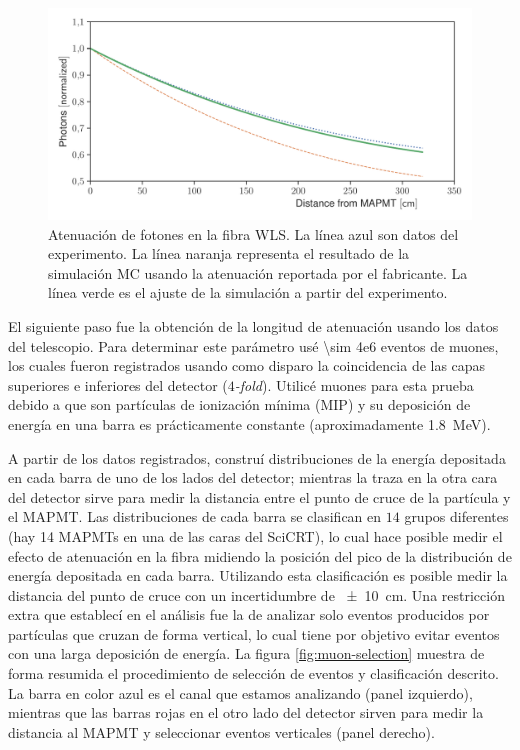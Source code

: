 \begin{figure}
        \centering
        \includegraphics[width=\textwidth]{data_atlength.pdf}
        \caption{Atenuación de fotones en la fibra WLS. La línea azul son datos del experimento. La línea naranja representa el resultado de la simulación MC usando la atenuación reportada por el fabricante. La línea verde es el ajuste de la simulación a partir del experimento.}
        \label{fig:atlength}
\end{figure}

El siguiente paso fue la obtención de la longitud de atenuación usando los datos del telescopio. Para determinar este parámetro usé \num{\sim 4e6} eventos de muones, los cuales fueron registrados usando como disparo la coincidencia de las capas superiores e inferiores del detector (\emph{$4$-fold}). Utilicé muones para esta prueba debido a que son partículas de ionización mínima (MIP) y su deposición de energía en una barra es prácticamente constante (aproximadamente \SI{1.8}{\mega\electronvolt}).

A partir de los datos registrados, construí distribuciones de la energía depositada en cada barra de uno de los lados del detector; mientras la traza en la otra cara del detector sirve para medir la distancia entre el punto de cruce de la partícula y el MAPMT. Las distribuciones de cada barra se clasifican en $14$ grupos diferentes (hay \num{14} MAPMTs en una de las caras del SciCRT), lo cual hace posible medir el efecto de atenuación en la fibra midiendo la posición del pico de la distribución de energía depositada en cada barra. Utilizando esta clasificación es posible medir la distancia del punto de cruce con un incertidumbre de \SI{\pm 10}{\cm}. Una restricción extra que establecí en el análisis fue la de analizar solo eventos producidos por partículas que cruzan de forma vertical, lo cual tiene por objetivo evitar eventos con una larga deposición de energía. La figura \ref{fig:muon-selection} muestra de forma resumida el procedimiento de selección de eventos y clasificación descrito. La barra en color azul es el canal que estamos analizando (panel izquierdo), mientras que las barras rojas en el otro lado del detector sirven para medir la distancia al MAPMT y seleccionar eventos verticales (panel derecho).

